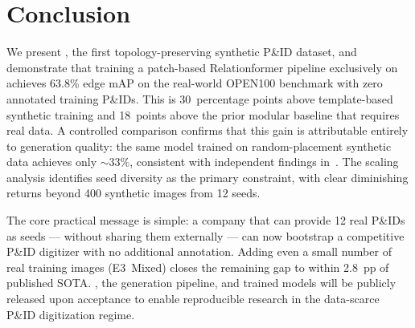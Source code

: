 
\section{Conclusion}
\label{sec:conclusion}

We present \textbf{\ours{}}, the first topology-preserving synthetic P\&ID
dataset, and demonstrate that training a patch-based Relationformer
pipeline exclusively on \ours{} achieves 63.8\% edge mAP on the
real-world OPEN100 benchmark with zero annotated training P\&IDs.
This is 30~percentage points above template-based synthetic training and
18~points above the prior modular baseline that requires real data.
A controlled comparison confirms that this gain is attributable entirely
to generation quality: the same model trained on random-placement
synthetic data achieves only ${\sim}33\%$, consistent with independent
findings in~\cite{sturmer2025}.
The scaling analysis identifies seed diversity as the primary constraint,
with clear diminishing returns beyond 400 synthetic images from 12 seeds.

The core practical message is simple: a company that can provide 12
real P\&IDs as seeds --- without sharing them externally --- can now
bootstrap a competitive P\&ID digitizer with no additional annotation.
Adding even a small number of real training images (E3~Mixed) closes
the remaining gap to within 2.8~pp of published SOTA.
\ours{}, the generation pipeline, and trained models will be publicly
released upon acceptance to enable reproducible research in the
data-scarce P\&ID digitization regime.
